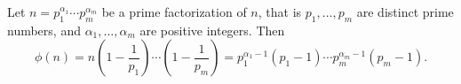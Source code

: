 \begin{thm}
Let $n = p_1^{\alpha_1} \cdots p_m^{\alpha_m}$ be a prime factorization of $n$, that is
$p_1, \ldots, p_m$ are distinct prime numbers, and $\alpha_1, \ldots, \alpha_m$ are positive integers.
Then
\[
\phi(n) = n\left(1-\frac{1}{p_1}\right) \cdots \left(1-\frac{1}{p_m}\right)
= p_1^{\alpha_1-1}(p_1-1) \cdots p_m^{\alpha_m-1}(p_m-1).
\]
\end{thm}